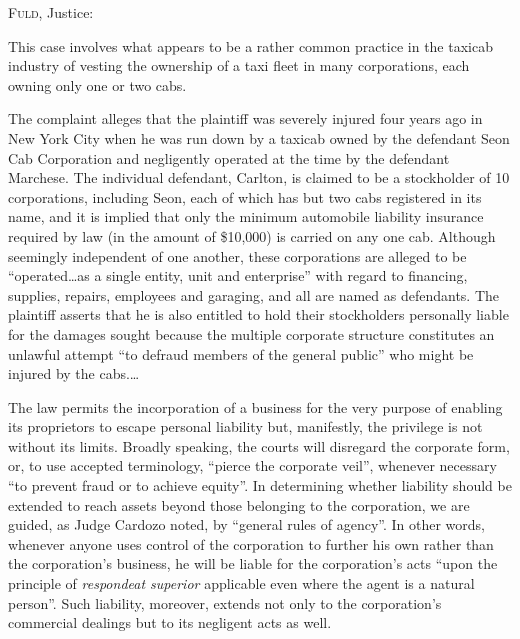 

\opinion \textsc{Fuld}, Justice: 

This case involves what appears to be a rather common practice in the taxicab
industry of vesting the ownership of a taxi fleet in many corporations, each
owning only one or two cabs. 

The complaint alleges that the plaintiff was severely injured four years ago in
New York City when he was run down by a taxicab owned by the defendant Seon Cab
Corporation and negligently operated at the time by the defendant Marchese. The
individual defendant, Carlton, is claimed to be a stockholder of 10
corporations, including Seon, each of which has but two cabs registered in its
name, and it is implied that only the minimum automobile liability insurance
required by law (in the amount of \$10,000) is carried on any one cab. Although
seemingly independent of one another, these corporations are alleged to be
``operated\ldots as a single entity, unit and enterprise'' with regard to
financing, supplies, repairs, employees and garaging, and all are named as
defendants. The plaintiff asserts that he is also entitled to hold their
stockholders personally liable for the damages sought because the multiple
corporate structure constitutes an unlawful attempt ``to defraud members of the
general public'' who might be injured by the cabs.\ldots 

The law permits the incorporation of a business for the very purpose of enabling
its proprietors to escape personal liability but, manifestly, the privilege is
not without its limits. Broadly speaking, the courts will disregard the
corporate form, or, to use accepted terminology, ``pierce the corporate veil'',
whenever necessary ``to prevent fraud or to achieve equity''. In determining
whether liability should be extended to reach assets beyond those belonging to
the corporation, we are guided, as Judge Cardozo noted, by ``general rules of
agency''. In other words, whenever anyone uses control of the corporation to
further his own rather than the corporation's business, he will be liable for
the corporation's acts ``upon the principle of \textit{respondeat superior}
applicable even where the agent is a natural person''. Such liability, moreover,
extends not only to the corporation's commercial dealings but to its negligent
acts as well. 

